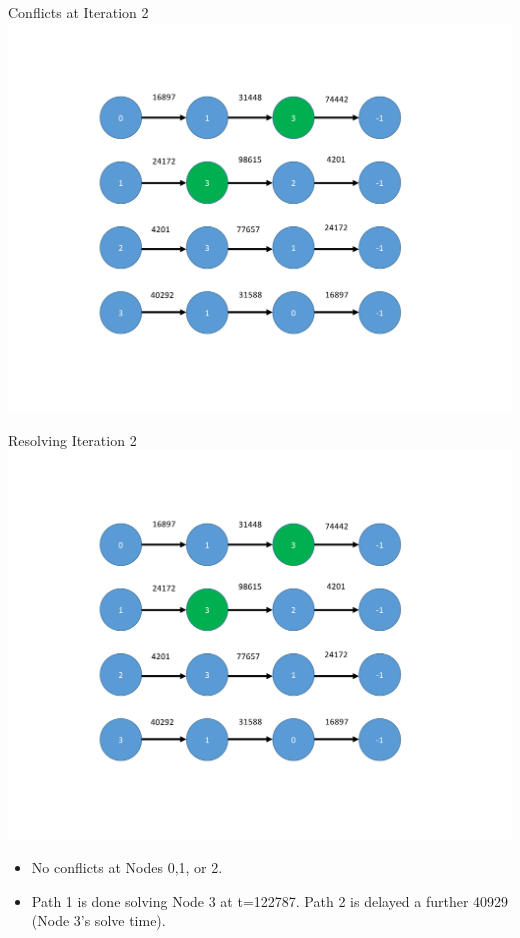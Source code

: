 \documentclass[xcolor={usenames,dvipsnames,svgnames,table}]{beamer}
\begin{document}
\begin{frame}[t]{Conflicts at Iteration 2}
\centering
\includegraphics[trim={2cm 2cm 4cm 2cm},clip,scale=0.45]{figures/iteration2_conflicts.pdf}
\end{frame}

\begin{frame}[t]{Resolving Iteration 2}
\centering
\includegraphics[trim={2cm 2cm 4cm 2cm},clip,scale=0.2]{figures/iteration2_conflicts.pdf}
\begin{block}{}
\begin{itemize}
	\item No conflicts at Nodes 0,1, or 2.
	\item Path 1 is done solving Node 3 at t=122787. Path 2 is delayed a further 40929 (Node 3's solve time).
\end{itemize}
\end{block}
\end{frame}
\end{document}
